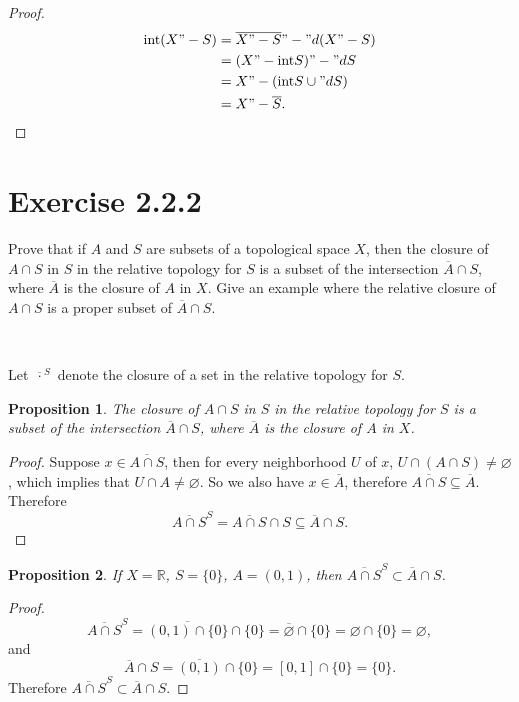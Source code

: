 \documentclass[12pt]{article}
\newtheorem{proposition}{Proposition}
\newenvironment{problem}
    {\begin{lrbox}{\mybox}\begin{minipage}{\textwidth-10pt}}
    {\end{minipage}\end{lrbox}\framebox[6.5in]{\usebox{\mybox}}\\}
\newcommand{\clo}[1]{\overline{#1}}
\newcommand{\R}{\mathbb{R}}
\let\emptyset\varnothing
\renewcommand{\int}{\text{int}}
\begin{document}
\begin{proof}
    \begin{align*}
        \int(X"-S)
            &= \clo{X"-S}"-"d(X"-S) \\
            &= (X"-\int S)"-"dS \\
            &= X"-(\int S \cup "dS) \\
            &= X"-\clo{S}.
    \end{align*}
    
\end{proof}

\section*{Exercise 2.2.2}
\begin{problem}
    Prove that if $A$ and $S$ are subsets of a topological space $X$, then the closure of $A\cap S$ in $S$ in the relative topology for $S$ is a subset of the intersection $\clo{A}\cap S$, where $\clo{A}$ is the closure of $A$ in $X$. Give an example where the relative closure of $A\cap S$ is a proper subset of $\clo{A}\cap S$.
\end{problem}

Let $\clo{\,\cdot\,}^S$ denote the closure of a set in the relative topology for $S$.

\begin{proposition}
    The closure of $A\cap S$ in $S$ in the relative topology for $S$ is a subset of the intersection $\clo{A}\cap S$, where $\clo{A}$ is the closure of $A$ in $X$.
\end{proposition}

\begin{proof}
    Suppose $x\in\clo{A\cap S}$, then for every neighborhood $U$ of $x$, $U\cap(A\cap S)\ne\emptyset$, which implies that $U\cap A\ne\emptyset$. So we also have $x\in\clo{A}$, therefore $\clo{A\cap S}\subseteq \clo{A}$. Therefore
    \[\clo{A\cap S}^S = \clo{A\cap S} \cap S \subseteq \clo{A}\cap S.\]
    
\end{proof}

\begin{proposition}
    If $X=\R$, $S=\{0\}$, $A=(0,1)$, then $\clo{A\cap S}^S\subset \clo{A}\cap S$.
\end{proposition}

\begin{proof}
    \[\clo{A\cap S}^S = \clo{(0,1)\cap \{0\}} \cap \{0\} = \clo{\emptyset}\cap\{0\} = \emptyset\cap\{0\}=\emptyset,\]
    and
    \[\clo{A}\cap S = \clo{(0,1)}\cap \{0\} = [0,1]\cap\{0\} = \{0\}.\]
    Therefore $\clo{A\cap S}^S\subset \clo{A}\cap S$.
\end{proof}
\end{document}
